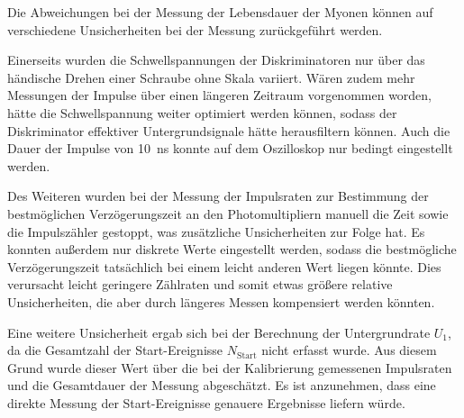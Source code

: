 Die Abweichungen bei der Messung der Lebensdauer der Myonen können auf verschiedene Unsicherheiten bei der Messung zurückgeführt werden.

Einerseits wurden die Schwellspannungen der Diskriminatoren nur über das händische Drehen einer Schraube ohne Skala variiert.
Wären zudem mehr Messungen der Impulse über einen längeren Zeitraum vorgenommen worden,
hätte die Schwellspannung weiter optimiert werden können,
sodass der Diskriminator effektiver Untergrundsignale hätte herausfiltern können.
%
Auch die Dauer der Impulse von \SI{10}{\nano\second} konnte auf dem Oszilloskop nur bedingt eingestellt werden.

Des Weiteren wurden bei der Messung der Impulsraten zur Bestimmung der bestmöglichen Verzögerungszeit an den Photomultipliern
manuell die Zeit sowie die Impulszähler gestoppt,
was zusätzliche Unsicherheiten zur Folge hat.
%
Es konnten außerdem nur diskrete Werte eingestellt werden,
sodass die bestmögliche Verzögerungszeit tatsächlich bei einem leicht anderen Wert liegen könnte.
Dies verursacht leicht geringere Zählraten und somit etwas größere relative Unsicherheiten,
die aber durch längeres Messen kompensiert werden könnten.

Eine weitere Unsicherheit ergab sich bei der Berechnung der Untergrundrate $U_1$,
da die Gesamtzahl der Start-Ereignisse $N_\text{Start}$ nicht erfasst wurde.
Aus diesem Grund wurde dieser Wert über die bei der Kalibrierung gemessenen Impulsraten und die Gesamtdauer der Messung abgeschätzt.
Es ist anzunehmen,
dass eine direkte Messung der Start-Ereignisse genauere Ergebnisse liefern würde.



